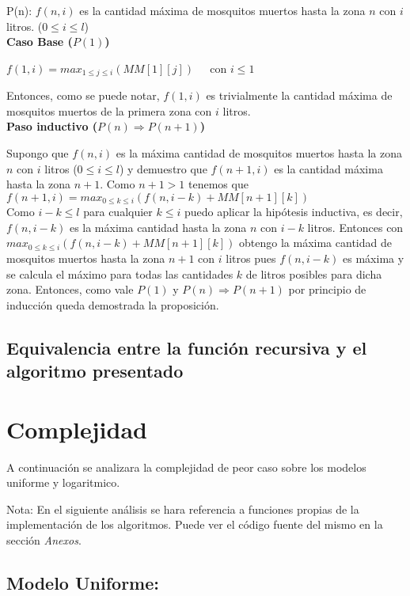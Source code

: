 \documentclass[a4paper,10pt] {article}
\begin{document}
P(n): $f(n, i)$ es la cantidad máxima de mosquitos muertos hasta la zona $n$ con $i$ litros. ($0 \leq i \leq l$) \\

\textbf{Caso Base ($P(1)$)}

$f(1,i) = max_{1 \leq j \leq i} (MM[1][j]) \;\;\;\; $ con $i \leq 1$

Entonces, como se puede notar, $f(1,i)$ es trivialmente la cantidad máxima de mosquitos muertos de la primera zona con $i$ litros. \\

\textbf{Paso inductivo ($P(n) \Rightarrow P(n+1)$)}

Supongo que $f(n,i)$ es la máxima cantidad de mosquitos muertos hasta la zona $n$ con $i$ litros ($0 \leq i \leq l$) y demuestro que $f(n+1,i)$ es la cantidad máxima hasta la zona $n+1$.
Como $n+1 > 1$ tenemos que \\

$f(n+1,i) = max_{0 \leq k \leq i} (f(n, i-k) + MM[n+1][k])$ \\

Como $i - k \leq l$ para cualquier $k \leq i$ puedo aplicar la hipótesis inductiva, es decir, $f(n,i-k)$ es la máxima cantidad hasta la zona $n$ con $i-k$ litros. Entonces con $max_{0 \leq k \leq i} (f(n, i-k) + MM[n+1][k])$ obtengo la máxima cantidad de mosquitos muertos hasta la zona $n+1$ con $i$ litros pues $f(n,i-k)$ es máxima y se calcula el máximo para todas las cantidades $k$ de litros posibles para dicha zona. Entonces, como vale $P(1)$ y $P(n) \Rightarrow P(n+1)$ por principio de inducci\'on queda demostrada la proposici\'on.

\subsection*{Equivalencia entre la función recursiva y el algoritmo presentado}


\section*{Complejidad}

A continuaci\'on se analizara la complejidad de peor caso sobre los modelos
uniforme y logaritmico.

Nota: En el siguiente an\'alisis se hara referencia a funciones propias de la implementaci\'on de los algoritmos. Puede ver el c\'odigo fuente del mismo en la secci\'on \textit{Anexos}.

\subsection*{Modelo Uniforme:}
\end{document}
